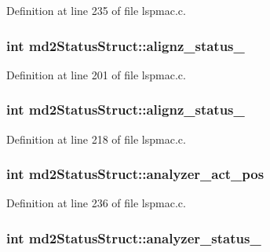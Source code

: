 Definition at line 235 of file lspmac.c.\hypertarget{structmd2StatusStruct_aadbfac5709de57e449a37e2937d6ade7}{
\subsubsection[{alignz\_\-status\_\-1}]{\setlength{\rightskip}{0pt plus 5cm}int {\bf md2StatusStruct::alignz\_\-status\_}}}
\label{structmd2StatusStruct_aadbfac5709de57e449a37e2937d6ade7}


Definition at line 201 of file lspmac.c.\hypertarget{structmd2StatusStruct_ac378da16eeaab2bc47f3f8f88f7411ed}{
\subsubsection[{alignz\_\-status\_\-2}]{\setlength{\rightskip}{0pt plus 5cm}int {\bf md2StatusStruct::alignz\_\-status\_}}}
\label{structmd2StatusStruct_ac378da16eeaab2bc47f3f8f88f7411ed}


Definition at line 218 of file lspmac.c.\hypertarget{structmd2StatusStruct_a49d1151b0e819646587be0ca9c9d612a}{
\subsubsection[{analyzer\_\-act\_\-pos}]{\setlength{\rightskip}{0pt plus 5cm}int {\bf md2StatusStruct::analyzer\_\-act\_\-pos}}}
\label{structmd2StatusStruct_a49d1151b0e819646587be0ca9c9d612a}


Definition at line 236 of file lspmac.c.\hypertarget{structmd2StatusStruct_ab876b484f55bcce576fcd89dcc3f7267}{
\subsubsection[{analyzer\_\-status\_\-1}]{\setlength{\rightskip}{0pt plus 5cm}int {\bf md2StatusStruct::analyzer\_\-status\_}}}
\label{structmd2StatusStruct_ab876b484f55bcce576fcd89dcc3f7267}


